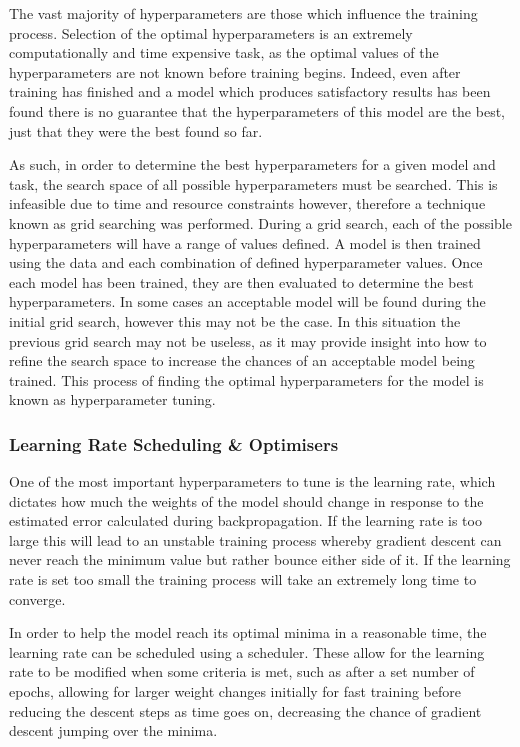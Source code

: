 The vast majority of hyperparameters are those which influence the training process. Selection of the optimal hyperparameters is an extremely computationally and time expensive task, as the optimal values of the hyperparameters are not known before training begins. Indeed, even after training has finished and a model which produces satisfactory results has been found there is no guarantee that the hyperparameters of this model are the best, just that they were the best found so far. 

As such, in order to determine the best hyperparameters for a given model and task, the search space of all possible hyperparameters must be searched. This is infeasible due to time and resource constraints however,  therefore a technique known as grid searching was performed. During a grid search, each of the possible hyperparameters will have a range of values defined. A model is then trained using the data and each combination of defined hyperparameter values. Once each model has been trained, they are then evaluated to determine the best hyperparameters. In some cases an acceptable model will be found during the initial grid search, however this may not be the case. In this situation the previous grid search may not be useless, as it may provide insight into how to refine the search space to increase the chances of an acceptable model being trained. This process of finding the optimal hyperparameters for the model is known as hyperparameter tuning. 

\subsubsection{Learning Rate Scheduling \& Optimisers}\label{ch:cetDet,sec:ModelSelection,sub:TrainingHyperparameters,subsub:learningRateOptimisers}
One of the most important hyperparameters to tune is the learning rate, which dictates how much the weights of the model should change in response to the estimated error calculated during backpropagation. If the learning rate is too large this will lead to an unstable training process whereby gradient descent can never reach the minimum value but rather bounce either side of it. If the learning rate is set too small the training process will take an extremely long time to converge. 

In order to help the model reach its optimal minima in a reasonable time, the learning rate can be scheduled using a scheduler. These allow for the learning rate to be modified when some criteria is met, such as after a set number of epochs, allowing for larger weight changes initially for fast training before reducing the descent steps as time goes on, decreasing the chance of gradient descent jumping over the minima.

